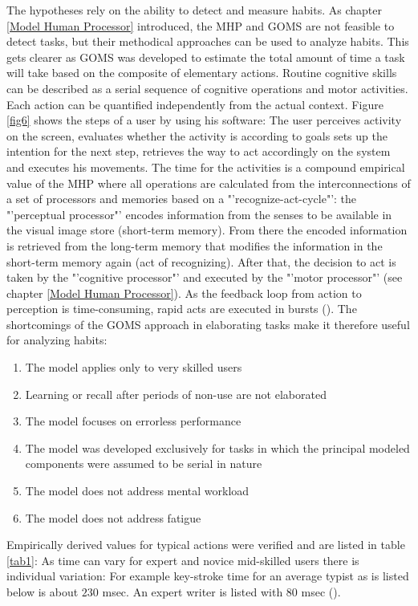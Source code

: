 The hypotheses rely on the ability to detect and measure habits. As chapter \ref{Model Human Processor} introduced, the \acf{MHP} and \acf{GOMS} are not feasible to detect tasks, but their methodical approaches can be used to analyze habits. This gets clearer as \ac{GOMS} was developed to estimate the total amount of time a task will take based on the composite of elementary actions. Routine cognitive skills can be described as a serial sequence of cognitive operations and motor activities. Each action can be quantified independently from the actual context. Figure \ref{fig6} shows the steps of a user by using his software: The user perceives activity on the screen, evaluates whether the activity is according to goals sets up the intention for the next step, retrieves the way to act accordingly on the system and executes his movements. The time for the activities is a compound empirical value of the \ac{MHP} where all operations are calculated from the interconnections of a set of processors and memories based on a "'recognize-act-cycle"': the "'perceptual processor"' encodes information from the senses to be available in the visual image  store (short-term memory). From there the encoded information is retrieved from the long-term memory that modifies the information in the short-term memory again (act of recognizing). After that, the decision to act is taken by the "'cognitive processor"' and executed by the "'motor processor"' (see chapter \ref{Model Human Processor}). As the feedback loop from action to perception is time-consuming, rapid acts are executed in bursts (\cite{card1986model}). The shortcomings of the \ac{GOMS} approach in elaborating tasks make it therefore useful for analyzing habits:

\begin{enumerate}
  \item The model applies only to very skilled users
  \item Learning or recall after periods of non-use are not elaborated
  \item The model focuses on errorless performance
  \item The model was developed exclusively for tasks in which the principal modeled components were assumed to be serial in nature
  \item The model does not address mental workload
  \item The model does not address fatigue
\end{enumerate}

Empirically derived values for typical actions were verified and are listed in table \ref{tab1}:
As time can vary for expert and novice mid-skilled users there is individual variation: For example key-stroke time for an average typist as is listed below is about $230$ msec. An expert writer is listed with $80$ msec (\cite{olson1990growth}).

